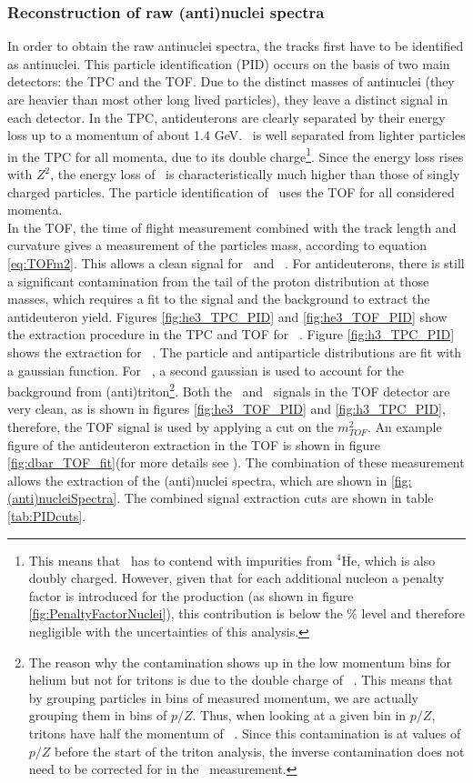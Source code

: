 \subsubsection{Reconstruction of raw (anti)nuclei spectra}
In order to obtain the raw antinuclei spectra, the tracks first have to be identified as antinuclei. This particle identification (PID) occurs on the basis of two main detectors: the TPC and the TOF. Due to the distinct masses of antinuclei (they are heavier than most other long lived particles), they leave a distinct signal in each detector. In the TPC, antideuterons are clearly separated by their energy loss up to a momentum of about 1.4 GeV. \ahe\ is well separated from lighter particles in the TPC for all momenta, due to its double charge\footnote{This means that \ahe\ has to contend with impurities from $^4\overline{\mathrm{He}}$, which is also doubly charged. However, given that for each additional nucleon a penalty factor is introduced for the production (as shown in figure \ref{fig:PenaltyFactorNuclei}), this contribution is below the \% level and therefore negligible with the uncertainties of this analysis.}. Since the energy loss rises with $Z^2$, the energy loss of \ahe\ is characteristically much higher than those of singly charged particles. The particle identification of \atrit\ uses the TOF for all considered momenta.\\
In the TOF, the time of flight measurement combined with the track length and curvature gives a measurement of the particles mass, according to equation \ref{eq:TOFm2}. This allows a clean signal for \atrit\ and \ahe\ . For antideuterons, there is still a significant contamination from the tail of the proton distribution at those masses, which requires a fit to the signal and the background to extract the antideuteron yield. Figures \ref{fig:he3_TPC_PID} and \ref{fig:he3_TOF_PID} show the extraction procedure in the TPC and TOF for \ahe\ . Figure \ref{fig:h3_TPC_PID} shows the extraction for \atrit\ . The particle and antiparticle distributions are fit with a gaussian function. For \ahe\ , a second gaussian is used to account for the background from (anti)triton\footnote{The reason why the contamination shows up in the low momentum bins for helium but not for tritons is due to the double charge of \ahe\ . This means that by grouping particles in bins of measured momentum, we are actually grouping them in bins of $p/Z$. Thus, when looking at a given bin in $p/Z$, tritons have half the momentum of \ahe\ . Since this contamination is at values of $p/Z$ before the start of the triton analysis, the inverse contamination does not need to be corrected for in the \atrit\ measurement. }. Both the \ahe\ and \atrit\  signals in the TOF detector are very clean, as is shown in figures \ref{fig:he3_TOF_PID} and \ref{fig:h3_TPC_PID}, therefore, the TOF signal is used by applying a cut on the $m_{TOF}^2$. An example figure of the antideuteron extraction in the TOF is shown in figure \ref{fig:dbar_TOF_fit}(for more details see \cite{dbar_ann}). The combination of these measurement allows the extraction of the (anti)nuclei spectra, which are shown in \ref{fig:(anti)nucleiSpectra}. The combined signal extraction cuts are shown in table \ref{tab:PIDcuts}.
